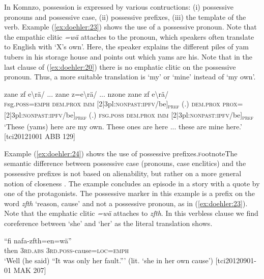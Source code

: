 \documentclass[output=paper]{langscibook}
\begin{document}
In Komnzo, possession is expressed by various contructions: (i) possessive pronouns and possessive case, (ii) possessive prefixes, (iii) the template of the verb. Example (\ref{ex:doehler:23}) shows the use of a possessive pronoun. Note that the empathic clitic \emph{=wä} attaches to the pronoun, which speakers often translate to English with `X's own'. Here, the speaker explains the different piles of yam tubers in his storage house and points out which yams are his. Note that in the last clause of (\ref{ex:doehler:20}) there is no emphatic clitic on the possessive pronoun. Thus, a more suitable translation is `my' or `mine' instead of `my own'.


\ea
	 {zane} {zf} {e\textbackslash{rä}/} ... {zane} {z=e\textbackslash{rä}/} ... {nzone} {zane} {zf} {e\textbackslash{rä}/}\\
	\textsc{f}sg.\textsc{poss}=\textsc{emph}{} \textsc{dem}.\textsc{prox}{} \textsc{imm}{} [2|3pl:\textsc{nonpast}:\textsc{ipfv}/be]\textsubscript{\textsc{pref}} (.) \textsc{dem}.\textsc{prox}{} \textsc{prox}=[2|3pl:\textsc{nonpast}:\textsc{ipfv}/be]\textsubscript{\textsc{pref}} (.) \textsc{f}\textsc{sg}.\textsc{poss}{} \textsc{dem}.\textsc{prox}{} \textsc{imm}{} [2|3pl:\textsc{nonpast}:\textsc{ipfv}/be]\textsubscript{\textsc{pref}}\\
	\glt `These (yams) here are my own. These ones are here ... these are mine here.' [tci20121001 ABB 129]
	\label{ex:doehler:23}
\z

Example (\ref{ex:doehler:24}) shows the use of possessive prefixes.\textsc{f}ootnote{The semantic difference between possessive case (pronouns, case enclitics) and the possessive prefixes is not based on alienability, but rather on a more general notion of closeness \citep[145]{Doehler2018}.} The example concludes an episode in a story with a quote by one of the protagonists. The possessive marker in this example is a prefix on the word \emph{zfth} `reason, cause' and not a possessive pronoun, as in (\ref{ex:doehler:23}). Note that the emphatic clitic \emph{=wä} attaches to \emph{zfth}. In this verbless clause we find coreference between `she' and `her' as the literal translation shows.


	\ea
	 ``{fi} {nafa-zfth=en=wä}''\\
	then \textsc{3rd}.\textsc{abs}{} \textsc{3rd}.\textsc{poss}-cause=\textsc{loc}=\textsc{emph}{}\\
	\glt `Well (he said) ``It was only her fault.''' (lit. `she in her own cause') [tci20120901-01 MAK 207]
	\label{ex:doehler:24}
\z
\end{document}
